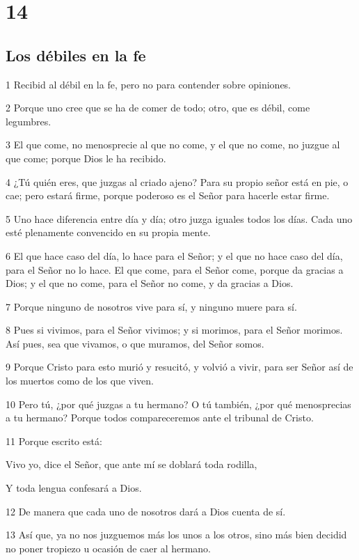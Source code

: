 \chapter{14}

\section*{Los débiles en la fe}

\par 1 Recibid al débil en la fe, pero no para contender sobre opiniones.
\par 2 Porque uno cree que se ha de comer de todo; otro, que es débil, come legumbres.
\par 3 El que come, no menosprecie al que no come, y el que no come, no juzgue al que come; porque Dios le ha recibido.
\par 4 ¿Tú quién eres, que juzgas al criado ajeno? Para su propio señor está en pie, o cae; pero estará firme, porque poderoso es el Señor para hacerle estar firme.
\par 5 Uno hace diferencia entre día y día; otro juzga iguales todos los días. Cada uno esté plenamente convencido en su propia mente.
\par 6 El que hace caso del día, lo hace para el Señor; y el que no hace caso del día, para el Señor no lo hace. El que come, para el Señor come, porque da gracias a Dios; y el que no come, para el Señor no come, y da gracias a Dios.
\par 7 Porque ninguno de nosotros vive para sí, y ninguno muere para sí.
\par 8 Pues si vivimos, para el Señor vivimos; y si morimos, para el Señor morimos. Así pues, sea que vivamos, o que muramos, del Señor somos.
\par 9 Porque Cristo para esto murió y resucitó, y volvió a vivir, para ser Señor así de los muertos como de los que viven.
\par 10 Pero tú, ¿por qué juzgas a tu hermano? O tú también, ¿por qué menosprecias a tu hermano? Porque todos compareceremos ante el tribunal de Cristo.
\par 11 Porque escrito está:
\par Vivo yo, dice el Señor, que ante mí se doblará toda rodilla,
\par Y toda lengua confesará a Dios.
\par 12 De manera que cada uno de nosotros dará a Dios cuenta de sí.
\par 13 Así que, ya no nos juzguemos más los unos a los otros, sino más bien decidid no poner tropiezo u ocasión de caer al hermano.
